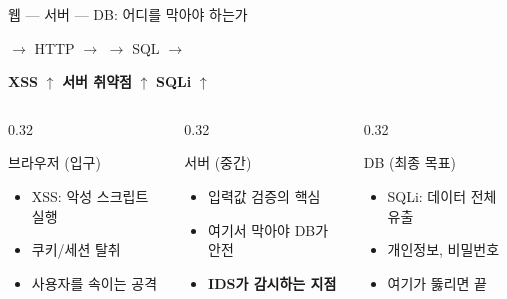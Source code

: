 \documentclass[aspectratio=169,10pt]{beamer}
\newcommand{\hlt}[1]{\textcolor{accent}{\textbf{#1}}}
\begin{document}
\begin{frame}[shrink=10]{웹 — 서버 — DB: 어디를 막아야 하는가}

\begin{center}
\quad $\rightarrow$ {\scriptsize HTTP} $\rightarrow$ \quad
{}
\quad $\rightarrow$ {\scriptsize SQL} $\rightarrow$ \quad
{}
\end{center}

\vspace{0.3em}
\begin{center}
{\footnotesize
\textcolor{redTeam}{\textbf{XSS} $\uparrow$} \hspace{2.5cm}
\textcolor{redTeam}{\textbf{서버 취약점} $\uparrow$} \hspace{2.5cm}
\textcolor{redTeam}{\textbf{SQLi} $\uparrow$}
}
\end{center}

\vspace{0.3em}
\begin{columns}[T]
\begin{column}{0.32\textwidth}
\begin{block}{브라우저 (입구)}
\begin{itemize}
    \item XSS: 악성 스크립트 실행
    \item 쿠키/세션 탈취
    \item 사용자를 속이는 공격
\end{itemize}
\end{block}
\end{column}
\begin{column}{0.32\textwidth}
\begin{block}{서버 (중간)}
\begin{itemize}
    \item 입력값 검증의 핵심
    \item 여기서 막아야 DB가 안전
    \item \hlt{IDS가 감시하는 지점}
\end{itemize}
\end{block}
\end{column}
\begin{column}{0.32\textwidth}
\begin{block}{DB (최종 목표)}
\begin{itemize}
    \item SQLi: 데이터 전체 유출
    \item 개인정보, 비밀번호
    \item 여기가 뚫리면 끝
\end{itemize}
\end{block}
\end{column}
\end{columns}
\end{frame}
\end{document}
